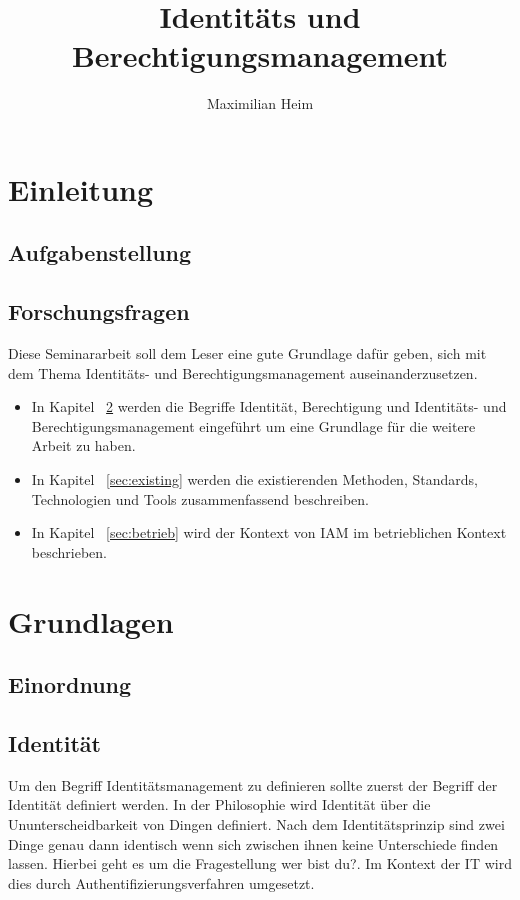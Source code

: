 \documentclass[10pt]{article}
\author{Maximilian Heim}
\title{Identitäts und Berechtigungsmanagement}
\begin{document}
\maketitle
\newpage
\tableofcontents
\newpage
\section{Einleitung}
\subsection{Aufgabenstellung}
\subsection{Forschungsfragen}
Diese Seminararbeit soll dem Leser eine gute Grundlage dafür geben, sich mit dem Thema Identitäts- und Berechtigungsmanagement auseinanderzusetzen.
\begin{itemize}
  \item In Kapitel ~\cref{sec:grundlagen} werden die Begriffe Identität, Berechtigung und Identitäts- und Berechtigungsmanagement eingeführt um eine Grundlage für die weitere Arbeit zu haben.
  \item In Kapitel ~\cref{sec:existing} werden die existierenden Methoden, Standards, Technologien und Tools zusammenfassend beschreiben.
  \item In Kapitel ~\cref{sec:betrieb} wird der Kontext von IAM im betrieblichen Kontext beschrieben.
\end{itemize}
\section{Grundlagen}
\label{sec:grundlagen}
\subsection{Einordnung}
\subsection{Identität}
Um den Begriff Identitätsmanagement zu definieren sollte zuerst der Begriff der Identität definiert werden. In der Philosophie wird Identität über die Ununterscheidbarkeit von Dingen definiert. Nach dem Identitätsprinzip sind zwei Dinge genau dann identisch wenn sich zwischen ihnen keine Unterschiede finden lassen. Hierbei geht es um die Fragestellung \glqq{}wer bist du?\grqq{}. Im Kontext der IT wird dies durch Authentifizierungsverfahren umgesetzt.
\end{document}
